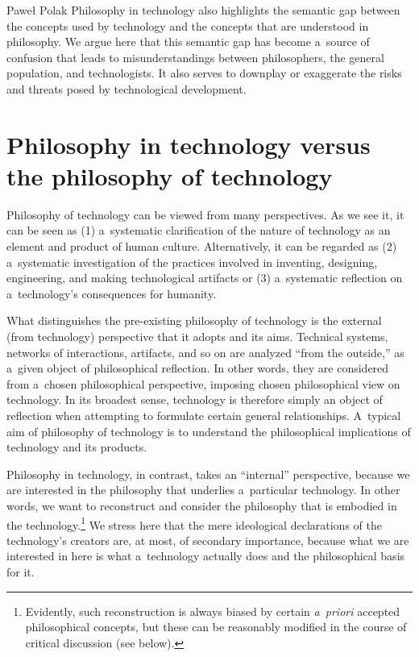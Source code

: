 \begin{artengenv}{Paweł Polak}
Philosophy in technology also highlights the semantic gap between the concepts used by technology and the concepts that are understood in philosophy. We argue here that this semantic gap has become a~source of confusion that leads to misunderstandings between philosophers, the general population, and technologists. It also serves to downplay or exaggerate the risks and threats posed by technological development.



\section{Philosophy in technology versus the philosophy of technology}

Philosophy of technology can be viewed from many perspectives. As we see it, it can be seen as (1) a~systematic clarification of the nature of technology as an element and product of human culture. Alternatively, it can be regarded as (2) a~systematic investigation of the practices involved in inventing, designing, engineering, and making technological artifacts or (3) a~systematic reflection on a~technology's consequences for humanity.



What distinguishes the pre-existing philosophy of technology is the external (from technology) perspective that it adopts and its aims. Technical systems, networks of interactions, artifacts, and so on are analyzed ``from the outside,'' as a~given object of philosophical reflection. In other words, they are considered from a~chosen philosophical perspective, imposing chosen philosophical view on technology. In its broadest sense, technology is therefore simply an object of reflection when attempting to formulate certain general relationships. A~typical aim of philosophy of technology is to understand the philosophical implications of technology and its products.



Philosophy in technology, in contrast, takes an ``internal'' perspective, because we are interested in the philosophy that underlies a~particular technology. In other words, we want to reconstruct and consider the philosophy that is embodied in the technology.\footnote{Evidently, such reconstruction is always biased by certain \textit{a~priori} accepted philosophical concepts, but these can be reasonably modified in the course of critical discussion (see below).} We stress here that the mere ideological declarations of the technology's creators are, at most, of secondary importance, because what we are interested in here is what a~technology actually does and the philosophical basis for it.




\end{artengenv}
